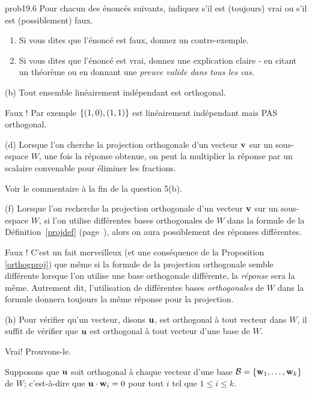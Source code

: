 \bigskip
\begin{sol}{prob19.6} Pour chacun des énoncés suivants, indiquez s'il est (toujours) vrai ou s'il est (possiblement) faux.   
   \smallskip    
\begin{enumerate}[$\bullet$]
\item Si vous dites que l'\'enonc\'e est faux, donnez un contre-exemple.   
\item Si vous dites que l'\'enonc\'e est vrai, donnez une explication claire - en citant un théorème ou en donnant une {\it preuve valide dans tous les cas}. 
\end{enumerate}
\medskip

(b) Tout ensemble linéairement indépendant est orthogonal.


\soln Faux ! Par exemple $\{(1,0), (1,1)\}$ est lin\'eairement ind\'ependant mais PAS orthogonal.
\medskip


(d) Lorsque l'on cherche la projection orthogonale d'un vecteur $\mathbf{v}$ sur un sous-espace $W$, une fois la réponse obtenue, on peut la multiplier la réponse par un  scalaire convenable pour éliminer les fractions.


 Voir le commentaire \`a la fin de la question 5(b).
\medskip

(f) Lorsque l'on recherche la projection orthogonale d'un vecteur $\mathbf{v}$ sur un sous-espace $W$, si l'on utilise différentes bases orthogonales de $W$ dans la formule de la Définition~\ref{projdef} (page~\pageref{projdef}), alors on aura possiblement des réponses différentes.


\soln Faux ! C'est un fait merveilleux (et une conséquence de la Proposition \ref{orthogproj}) que même si la formule de la projection orthogonale semble différente lorsque l'on utilise une base orthogonale différente, la {\it réponse} sera  la même. Autrement dit, l'utilisation de différentes bases {\it orthogonales} de $W$ dans la formule donnera toujours la même réponse pour la projection.
\medskip


(h) Pour vérifier qu'un vecteur, disons $\mathbf{u}$, est orthogonal à tout vecteur dans $W$, il suffit de vérifier que $\mathbf{u}$ est orthogonal à tout vecteur d'une base de $W$.


\soln Vrai! Prouvons-le. 

Supposons que $\mathbf{u}$ soit orthogonal à chaque vecteur d'une base $\mathcal B =\{\mathbf{w}_1, \dots , \mathbf{w}_k\}$ de $W$; c'est-à-dire que $\mathbf{u}\cdot \mathbf{w}_i=0$ pour tout $i$ tel que $1\le i \le k$. 


\end{sol}
